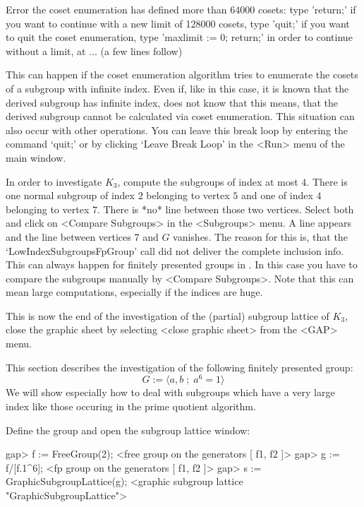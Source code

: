 \begintt
Error the coset enumeration has defined more than 64000 cosets:
type 'return;' if you want to continue with a new limit of 128000 cosets,
type 'quit;' if you want to quit the coset enumeration,
type 'maxlimit := 0; return;' in order to continue without a limit,
 at
...   (a few lines follow)
\endtt

This can happen if the coset enumeration algorithm tries to enumerate the
cosets of a subgroup with infinite index. Even if, like in this case, it is 
known that the derived subgroup has infinite index, {\XGAP} does not know
that this means, that the derived subgroup cannot be calculated via coset
enumeration. This situation can also occur with other operations. You can
leave this break loop by entering the command `quit;' or by clicking `Leave 
Break Loop' in the <Run> menu of the main {\XGAP} window.

In order to investigate $K_3$, compute the  subgroups of index at
most $4$.  There is one normal subgroup of  index $2$ belonging to vertex
$5$ and one of index $4$ belonging to vertex $7$. There is *no* line
between those two vertices. Select both and click on <Compare Subgroups> in 
the <Subgroups> menu. A line appears and the line between vertices $7$ and
$G$ vanishes. The reason for this is, that the `LowIndexSubgroupsFpGroup'
call did not deliver the complete inclusion info. This can always happen
for finitely presented groups in {\XGAP}. In this case you have to compare
the subgroups manually by <Compare Subgroups>. Note that this can mean
large computations, especially if the indices are huge. 

This is  now   the end  of the investigation   of  the (partial) subgroup
lattice of $K_3$,  close the graphic  sheet  by selecting <close  graphic
sheet> from the <GAP> menu.



This section describes the investigation of the following finitely presented
group: 
$$ G := \langle a, b \; ; \; a^6 = 1 \rangle $$
We will show especially how to deal with subgroups which have a very large
index like those occuring in the prime quotient algorithm.

Define the group and open the subgroup lattice window:

\begintt
gap> f := FreeGroup(2);
<free group on the generators [ f1, f2 ]>
gap> g := f/[f.1^6];
<fp group on the generators [ f1, f2 ]>
gap> s := GraphicSubgroupLattice(g);
<graphic subgroup lattice "GraphicSubgroupLattice">
\endtt

